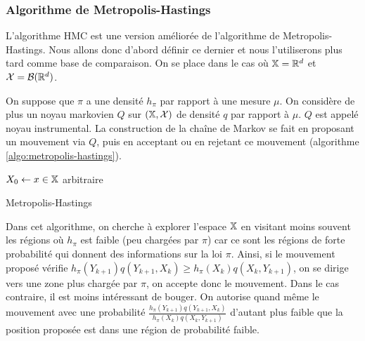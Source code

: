 \documentclass[10pt,a4paper]{article}
\begin{document}
\subsubsection{Algorithme de Metropolis-Hastings}

L'algorithme HMC est une version améliorée de l'algorithme de Metropolis-Hastings. Nous allons donc d'abord définir ce dernier et nous l'utiliserons plus tard comme base de comparaison. On se place dans le cas où $\mathbb{X} = \mathbb{R}^d$ et $\mathcal{X} = \mathcal{B}(\mathbb{R}^d)$. 

On suppose que $\pi$ a une densité $h_\pi$ par rapport à une mesure $\mu$. On considère de plus un noyau markovien $Q$ sur $(\mathbb{X}, \mathcal{X})$ de densité $q$ par rapport à $\mu$. $Q$ est appelé noyau instrumental. La construction de la chaîne de Markov se fait en proposant un mouvement via $Q$, puis en acceptant ou en rejetant ce mouvement (algorithme \ref{algo:metropolis-hastings}).

\begin{center}
	\begin{algorithm}[H]
		$X_0 \leftarrow x \in \mathbb{X}$ arbitraire\;
		\caption{Metropolis-Hastings}
		\label{algo:metropolis-hastings}
	\end{algorithm}
\end{center}

Dans cet algorithme, on cherche à explorer l'espace $\mathbb{X}$ en visitant moins souvent les régions où $h_\pi$ est faible (peu chargées par $\pi$) car ce sont les régions de forte probabilité qui donnent des informations sur la loi $\pi$. Ainsi, si le mouvement proposé vérifie $h_\pi(Y_{k+1})q(Y_{k+1}, X_k) \geq h_\pi(X_k) q(X_k, Y_{k+1})$, on se dirige vers une zone plus chargée par $\pi$, on accepte donc le mouvement. Dans le cas contraire, il est moins intéressant de bouger. On autorise quand même le mouvement avec une probabilité $\frac{h_\pi(Y_{k+1})q(Y_{k+1},X_k)}{h_\pi(X_k)q(X_k,Y_{k+1})}$ d'autant plus faible que la position proposée est dans une région de probabilité faible.
\end{document}
